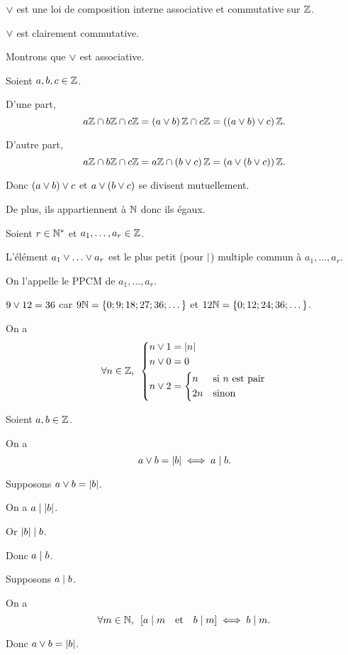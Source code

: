 \begin{prop}
\(\lor\) est une loi de composition interne associative et commutative sur \(\mathbb{Z}\).
\end{prop}

\begin{dem}
\(\lor\) est clairement commutative.

Montrons que \(\lor\) est associative.

Soient \(a,b,c\in\mathbb{Z}\).

D'une part, \[a\mathbb{Z}\cap b\mathbb{Z}\cap c\mathbb{Z}=\left(a\lor b\right)\mathbb{Z}\cap c\mathbb{Z}=\left(\left(a\lor b\right)\lor c\right)\mathbb{Z}.\]

D'autre part, \[a\mathbb{Z}\cap b\mathbb{Z}\cap c\mathbb{Z}=a\mathbb{Z}\cap\left(b\lor c\right)\mathbb{Z}=\left(a\lor\left(b\lor c\right)\right)\mathbb{Z}.\]

Donc \(\left(a\lor b\right)\lor c\) et \(a\lor\left(b\lor c\right)\) se divisent mutuellement.

De plus, ils appartiennent à \(\mathbb{N}\) donc ils égaux.
\end{dem}

\begin{defi}
Soient \(r\in\mathbb{N}^*\) et \(a_1,\dots,a_r\in\mathbb{Z}\).

L'élément \(a_1\ou\dots\ou a_r\) est le plus petit (pour \(\mid\)) multiple commun à \(a_1,\dots,a_r\).

On l'appelle le PPCM de \(a_1,\dots,a_r\).
\end{defi}

\begin{ex}
\(9\lor12=36\) car \(9\mathbb{N}=\left\lbrace0;9;18;27;36;\dots\right\rbrace\) et \(12\mathbb{N}=\left\lbrace0;12;24;36;\dots\right\rbrace\).

On a \[\quantifs{\forall n\in\Z}\begin{dcases}n\ou1=\abs{n} \\ n\ou0=0 \\ n\ou2=\begin{dcases}n &\text{si \(n\) est pair} \\ 2n &\text{sinon}\end{dcases}\end{dcases}\]
\end{ex}

\begin{rem}
Soient \(a,b\in\mathbb{Z}\).

On a \[a\lor b=\left\lvert b\right\rvert\iff a\mid b.\]
\end{rem}

\begin{dem}
\impdir

Supposons \(a\lor b=\left\lvert b\right\rvert\).

On a \(a\mid\left\lvert b\right\rvert\).

Or \(\left\lvert b\right\rvert\mid b\).

Donc \(a\mid b\).

\imprec

Supposons \(a\mid b\).

On a \[\quantifs{\forall m\in\N}\croch{a\divise m\quad\text{et}\quad b\divise m}\ssi b\divise m.\]

Donc \(a\lor b=\left\lvert b\right\rvert\).
\end{dem}

